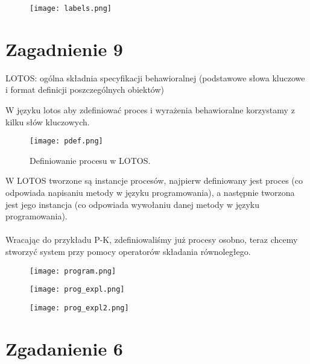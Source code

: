 \documentclass[a4paper,15pt]{article}
\newcommand{\example}[2]{
    \begin{tcolorbox}[colback=blue!5!white,colframe=blue,title={Przykład #1}]
        #2
    \end{tcolorbox}
}
\newcommand{\issue}[2]{
    \begin{tcolorbox}[colback=issueColor!5!white,colframe=issueColor,title={Zagadnienie #1}]
        #2
    \end{tcolorbox}
}
\begin{document}
\begin{figure}[H]
\centerline{\texttt{[image: labels.png]}}
\end{figure}

\newpage
\section{Zagadnienie 9}

\issue{9}{
LOTOS: ogólna składnia specyfikacji behawioralnej (podstawowe słowa
kluczowe i format definicji poszczególnych obiektów)
}


W języku lotos aby zdefiniować proces i wyrażenia behawioralne korzystamy z kilku słów kluczowych. 
\begin{figure}[H]
\centerline{\texttt{[image: pdef.png]}}
\caption{Definiowanie procesu w LOTOS.}
\label{fig:pdef}
\end{figure}


W LOTOS tworzone są instancje procesów, najpierw definiowany jest proces (co odpowiada napisaniu metody w języku programowania), a następnie tworzona jest jego instancja (co odpowiada wywołaniu danej metody w języku programowania). \\ \\

Wracając do przykładu P-K, zdefiniowaliśmy już procesy osobno, teraz chcemy stworzyć system przy pomocy operatorów składania równoległego. 
\example{}{
\begin{figure}[H]
\centerline{\texttt{[image: program.png]}}
\label{fig:program}
\end{figure}
}  

\begin{figure}[H]
\centerline{\texttt{[image: prog\_expl.png]}}
\label{fig:program_expl}
\end{figure}

\begin{figure}[H]
\centerline{\texttt{[image: prog\_expl2.png]}}
\label{fig:program_expl2}
\end{figure}











\newpage
\section{Zgadanienie 6}
\end{document}
